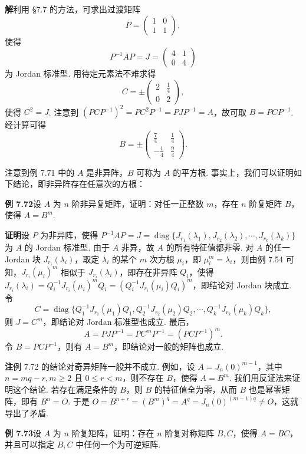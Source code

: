 \documentclass[UTF8,12pt,a4paper,fontset=fandol]{ctexart}
\begin{document}
\noindent\textbf{解}\quad 利用 §7.7 的方法，可求出过渡矩阵
\[
P=\left(\begin{array}{cc}1&0\\1&1\end{array}\right),
\]
使得
\[
P^{-1}AP=J=\left(\begin{array}{cc}4&1\\0&4\end{array}\right)
\]
为 Jordan 标准型. 用待定元素法不难求得
\[
C=\pm\left(\begin{array}{cc}2&\frac14\\0&2\end{array}\right),
\]
使得 $C^2=J$. 注意到 $(PCP^{-1})^2=PC^2P^{-1}=PJP^{-1}=A$，故可取 $B=PCP^{-1}$. 经计算可得
\[
B=\pm\left(\begin{array}{rr}
\frac74&\frac14\\
-\frac14&\frac94
\end{array}\right).
\]

注意到例 7.71 中的 $A$ 是非异阵，$B$ 可称为 $A$ 的平方根. 事实上，我们可以证明如下结论，即非异阵存在任意次的方根：

\noindent\textbf{例 7.72}\quad 设 $A$ 为 $n$ 阶非异复矩阵，证明：对任一正整数 $m$，存在 $n$ 阶复矩阵 $B$，使得 $A=B^m$.

\noindent\textbf{证明}\quad 设 $P$ 为非异阵，使得 $P^{-1}AP=J=\operatorname{diag}\{J_{r_1}(\lambda_1),J_{r_2}(\lambda_2),\cdots,J_{r_k}(\lambda_k)\}$ 为 $A$ 的 Jordan 标准型. 由于 $A$ 非异，故 $A$ 的所有特征值都非零. 对 $A$ 的任一 Jordan 块 $J_{r_i}(\lambda_i)$，取定 $\lambda_i$ 的某个 $m$ 次方根 $\mu_i$，即 $\mu_i^m=\lambda_i$，则由例 7.54 可知，$J_{r_i}(\mu_i)^m$ 相似于 $J_{r_i}(\lambda_i)$，即存在非异阵 $Q_i$，使得 $J_{r_i}(\lambda_i)=Q_i^{-1}J_{r_i}(\mu_i)^mQ_i=(Q_i^{-1}J_{r_i}(\mu_i)Q_i)^m$，即结论对 Jordan 块成立. 令
\[
C=\operatorname{diag}\{Q_1^{-1}J_{r_1}(\mu_1)Q_1,Q_2^{-1}J_{r_2}(\mu_2)Q_2,\cdots,Q_k^{-1}J_{r_k}(\mu_k)Q_k\},
\]
则 $J=C^m$，即结论对 Jordan 标准型也成立. 最后，
\[
A=PJP^{-1}=PC^mP^{-1}=(PCP^{-1})^m.
\]
令 $B=PCP^{-1}$，则有 $A=B^m$，即结论对一般的矩阵也成立.

\noindent\textbf{注}\quad 例 7.72 的结论对奇异矩阵一般并不成立. 例如，设 $A=J_n(0)^{m-1}$，其中 $n=mq-r,m\ge2$ 且 $0\le r<m$，则不存在 $B$，使得 $A=B^m$. 我们用反证法来证明这个结论. 若存在满足条件的 $B$，则 $B$ 的特征值全为零，从而 $B$ 也是幂零矩阵，即有 $B^n=O$. 于是 $O=B^{n+r}=(B^m)^q=A^q=J_n(0)^{(m-1)q}\ne O$，这就导出了矛盾.

\noindent\textbf{例 7.73}\quad 设 $A$ 为 $n$ 阶复矩阵，证明：存在 $n$ 阶复对称矩阵 $B,C$，使得 $A=BC$，并且可以指定 $B,C$ 中任何一个为可逆矩阵.
\end{document}
